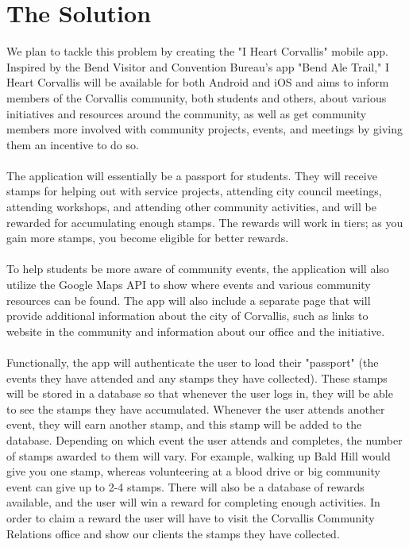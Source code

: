 \documentclass[draftclsnofoot, onecolumn, 10pt, compsoc]{IEEEtran}
\begin{document}
	\section{The Solution}
		We plan to tackle this problem by creating the "I Heart Corvallis" mobile app. Inspired by the Bend Visitor and 
		Convention Bureau's app "Bend Ale Trail," I Heart Corvallis will be available for both Android and iOS and aims to 
		inform members of the Corvallis community, both students and others, about various initiatives and resources around 
		the community, as well as get community members more involved with community projects, events, and meetings by 
		giving them an incentive to do so. \\ \\			
		The application will essentially be a passport for students. They will receive stamps for helping out with service 
		projects, attending city council meetings, attending workshops, and attending other community activities, and will be 
		rewarded for accumulating enough stamps. The rewards will work in tiers; as you gain more stamps, you become 
		eligible for better rewards. \\ \\			
		To help students be more aware of community events, the application will also utilize the Google Maps API to show 
		where events and various community resources can be found. The app will also include a separate page that will 
		provide additional information about the city of Corvallis, such as links to website in the community and information 
		about our office and the initiative. \\ \\			
		Functionally, the app will authenticate the user to load their "passport" (the events they have attended and any stamps 
		they have collected). These stamps will be stored in a database so that whenever the user logs in, they will be able to 
		see the stamps they have accumulated. Whenever the user attends another event, they will earn another stamp, and 
		this stamp will be added to the database. Depending on which event the user attends and completes, the number of 
		stamps awarded to them will vary. For example, walking up Bald Hill would give you one stamp, whereas volunteering 
		at a blood drive or big community event can give up to 2-4 stamps. There will also be a database of rewards available, 
		and the user will win a reward for completing enough activities. In order to claim a reward the user will have to visit the 
		Corvallis Community Relations office and show our clients the stamps they have collected. \\ \\			
\end{document}
